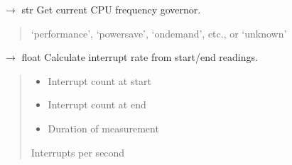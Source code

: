 \documentclass[letterpaper,10pt,english]{sphinxmanual}
\begin{document}
\begin{fulllineitems}
\label{\detokenize{core.execution.hardware_collector:core.execution.hardware_collector.get_governor}}
\pysigstartsignatures
\pysiglinewithargsret
{}
{}
{{ $\rightarrow$ str}}
\pysigstopsignatures
\sphinxAtStartPar
Get current CPU frequency governor.
\begin{quote}\begin{description}
\sphinxAtStartPar
‘performance’, ‘powersave’, ‘ondemand’, etc., or ‘unknown’

\end{description}\end{quote}

\end{fulllineitems}


\begin{fulllineitems}
\label{\detokenize{core.execution.hardware_collector:core.execution.hardware_collector.get_interrupt_rate}}
\pysigstartsignatures
\pysiglinewithargsret
{}
{\sphinxparamcomma {}\sphinxparamcomma {}}
{{ $\rightarrow$ float}}
\pysigstopsignatures
\sphinxAtStartPar
Calculate interrupt rate from start/end readings.
\begin{quote}\begin{description}
\begin{itemize}
\item {} 
\sphinxAtStartPar
{} \textendash{} Interrupt count at start

\item {} 
\sphinxAtStartPar
{} \textendash{} Interrupt count at end

\item {} 
\sphinxAtStartPar
{} \textendash{} Duration of measurement

\end{itemize}

\sphinxAtStartPar
Interrupts per second

\end{description}\end{quote}

\end{fulllineitems}
\end{document}
